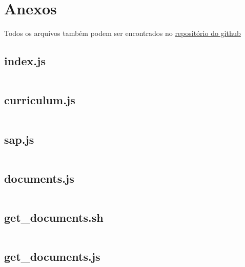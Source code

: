 \section{Anexos}

Todos os arquivos também podem ser encontrados no \href{https://github.com/bamorim/sigapi}{repositório do github}

\subsection{index.js}
\label{code:index.js}
\inputminted[linenos]{javascript}{../sigapi/index.js}

\subsection{curriculum.js}
\label{code:curriculum.js}
\inputminted[linenos]{javascript}{../sigapi/curriculum.js}

\subsection{sap.js}
\label{code:sap.js}
\inputminted[linenos]{javascript}{../sigapi/sap.js}

\subsection{documents.js}
\label{code:documents.js}
\inputminted[linenos]{javascript}{../sigapi/documents.js}

\subsection{get\_documents.sh}
\label{code:get_documents.sh}
\inputminted[linenos]{bash}{../sigapi/scripts/get_documents.sh}

\subsection{get\_documents.js}
\label{code:get_documents.js}
\inputminted[linenos]{javascript}{../sigapi/scripts/get_documents.js}

\theendnotes


